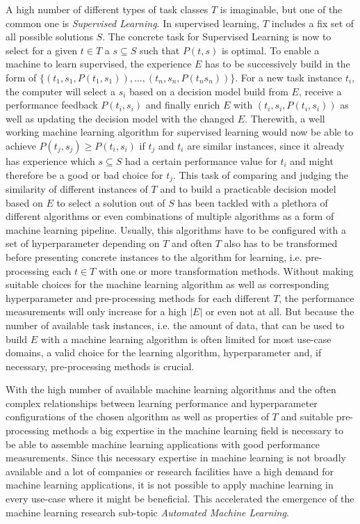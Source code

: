 A high number of different types of task classes $T$ is imaginable, but one of the common one is \textit{Supervised Learning}.
In supervised learning, $T$ includes a fix set of all possible solutions $S$.
The concrete task for Supervised Learning is now to select for a given $t\in T$ a $s\subseteq S$ such that $P(t,s)$ is optimal.
To enable a machine to learn supervised, the experience $E$ has to be successively build in the form of $\{(t_1, s_1, P(t_1, s_1)), ..., (t_n, s_n, P(t_n s_n))\}$.
For a new task instance $t_i$, the computer will select a $s_i$ based on a decision model build from $E$, receive a performance feedback $P(t_i, s_i)$ and finally enrich $E$ with $(t_i, s_i, P(t_i, s_i))$ as well as updating the decision model with the changed $E$.
Therewith, a well working machine learning algorithm for supervised learning would now be able to achieve $P(t_j, s_j) \geq P(t_i, s_i)$ if $t_j$ and $t_i$ are similar instances, since it already has experience which $s\subseteq S$ had a certain performance value for $t_i$ and might therefore be a good or bad choice for $t_j$.\newline
This task of comparing and judging the similarity of different instances of $T$ and to build a practicable decision model based on $E$ to select a solution out of $S$ has been tackled with a plethora of different algorithms or even combinations of multiple algorithms as a form of machine learning pipeline.
Usually, this algorithms have to be configured with a set of hyperparameter depending on $T$ and often $T$ also has to be transformed before presenting concrete instances to the algorithm for learning, i.e. pre-processing each $t\in T$ with one or more transformation methods.
Without making suitable choices for the machine learning algorithm as well as corresponding hyperparameter and pre-processing methods for each different $T$, the performance measurements will only increase for a high $|E|$ or even not at all.
But because the number of available task instances, i.e. the amount of data, that can be used to build $E$ with a machine learning algorithm is often limited for most use-case domains, a valid choice for the learning algorithm, hyperparameter and, if necessary, pre-processing methods is crucial.

With the high number of available machine learning algorithms and the often complex relationships between learning performance and hyperparameter configurations of the chosen algorithm as well as properties of $T$ and suitable pre-processing methods a big expertise in the machine learning field is necessary to be able to assemble machine learning applications with good performance measurements.
Since this necessary expertise in machine learning is not broadly available and a lot of companies or research facilities have a high demand for machine learning applications, it is not possible to apply machine learning in every use-case where it might be beneficial.
This accelerated the emergence of the machine learning research sub-topic \textit{Automated Machine Learning}. 

